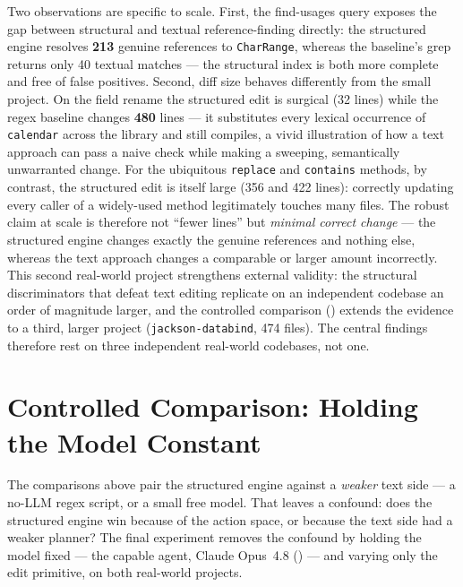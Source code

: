Two observations are specific to scale. First, the find-usages query exposes the gap
between structural and textual reference-finding directly: the structured engine
resolves \textbf{213} genuine references to \texttt{CharRange}, whereas the baseline's
grep returns only 40 textual matches --- the structural index is both more complete
and free of false positives. Second, diff size behaves differently from the small
project. On the field rename the structured edit is surgical (32 lines) while the
regex baseline changes \textbf{480} lines --- it substitutes every lexical occurrence
of \texttt{calendar} across the library and still compiles, a vivid illustration of
how a text approach can pass a naive check while making a sweeping, semantically
unwarranted change. For the ubiquitous \texttt{replace} and \texttt{contains} methods,
by contrast, the structured edit is itself large (356 and 422 lines): correctly
updating every caller of a widely-used method legitimately touches many files. The
robust claim at scale is therefore not ``fewer lines'' but \emph{minimal correct
change} --- the structured engine changes exactly the genuine references and nothing
else, whereas the text approach changes a comparable or larger amount incorrectly.
This second real-world project strengthens external validity: the structural
discriminators that defeat text editing replicate on an independent codebase an order of
magnitude larger, and the controlled comparison () extends the
evidence to a third, larger project (\texttt{jackson-databind}, 474 files). The central
findings therefore rest on three independent real-world codebases, not one.

\section{Controlled Comparison: Holding the Model Constant}
\label{sec:eval-controlled}
The comparisons above pair the structured engine against a \emph{weaker} text side
--- a no-LLM regex script, or a small free model. That leaves a confound: does the
structured engine win because of the action space, or because the text side had a
weaker planner? The final experiment removes the confound by holding the model
fixed --- the capable agent, Claude Opus~4.8 () --- and varying
only the edit primitive, on both real-world projects.

